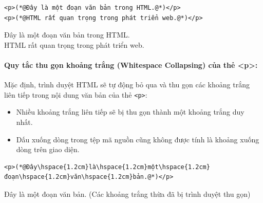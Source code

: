 \documentclass[11pt,oneside]{book}
\newcommand{\codeinline}[1]{\textcolor{accentOrange}{\texttt{#1}}}
\begin{document}
\begin{codeWindow}
\begin{lstlisting}[language=HTML5]
<p>(*@Đây là một đoạn văn bản trong HTML.@*)</p>
<p>(*@HTML rất quan trọng trong phát triển web.@*)</p>
\end{lstlisting}
\end{codeWindow}
\begin{tcolorbox}[
    enhanced,
    colback=white,
    colframe=primaryBlue!20,
    arc=6pt,
    boxrule=0.8pt,
    drop shadow=black!3!white,
    top=8pt, bottom=8pt, left=12pt, right=12pt,
    title={\sffamily\bfseries\scriptsize\color{codeComment} KẾT QUẢ HIỂN THỊ TRÊN TRÌNH DUYỆT (BROWSER PREVIEW)},
    coltitle=codeComment,
    colbacktitle=codeBg!80!white
]
Đây là một đoạn văn bản trong HTML.\\[4pt]
HTML rất quan trọng trong phát triển web.
\end{tcolorbox}


\paragraph{Quy tắc thu gọn khoảng trắng (Whitespace Collapsing) của thẻ <p>:}
Mặc định, trình duyệt HTML sẽ tự động bỏ qua và thu gọn các khoảng trắng liên tiếp trong nội dung văn bản của thẻ \codeinline{<p>}:
\begin{itemize}[leftmargin=1.5em, itemsep=2pt, parsep=0pt]
    \item Nhiều khoảng trắng liên tiếp sẽ bị thu gọn thành một khoảng trắng duy nhất.
    \item Dấu xuống dòng trong tệp mã nguồn cũng không được tính là khoảng xuống dòng trên giao diện.
\end{itemize}

\begin{codeWindow}
\begin{lstlisting}[language=HTML5]
<p>(*@Đây\hspace{1.2cm}là\hspace{1.2cm}một\hspace{1.2cm}đoạn\hspace{1.2cm}văn\hspace{1.2cm}bản.@*)</p>
\end{lstlisting}
\end{codeWindow}

\begin{tcolorbox}[
    enhanced,
    colback=codeBg!30!white,
    colframe=primaryBlue!20,
    arc=6pt,
    boxrule=0.8pt,
    title={\sffamily\bfseries\scriptsize\color{codeComment} KẾT QUẢ HIỂN THỊ TRÊN TRÌNH DUYỆT (BROWSER PREVIEW)},
    coltitle=codeComment,
    colbacktitle=codeBg!80!white
]
Đây là một đoạn văn bản. \hfill \scriptsize\color{codeComment}(Các khoảng trắng thừa đã bị trình duyệt thu gọn)
\end{tcolorbox}
\end{document}
